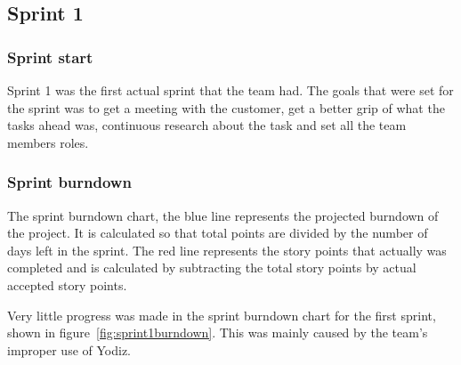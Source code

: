 \subsection{Sprint 1}

\subsubsection{Sprint start}

Sprint 1 was the first actual sprint that the team had. The goals that were set for the sprint was to get a meeting with the customer,
get a better grip of what the tasks ahead was, continuous research about the task and set all the team members roles.

\subsubsection{Sprint burndown}

The sprint burndown chart, the blue line represents the projected burndown of the project. It is calculated so that total points are divided by the number of days left in the sprint. The red line represents the story points that actually was completed and is calculated by subtracting the total story points by actual accepted story points.

Very little progress was made in the sprint burndown chart for the first sprint, shown in figure~\ref{fig:sprint1burndown}. This was mainly caused by the team's improper use of Yodiz.

